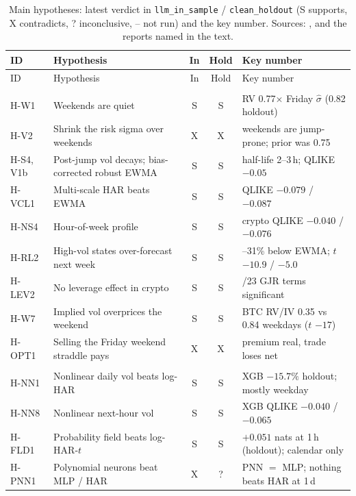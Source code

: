 \documentclass[10pt,a4paper]{article}
\newcommand{\seg}[1]{\texttt{#1}}
\begin{document}
{\small
\begin{longtable}{@{}>{\raggedright\arraybackslash}p{1.55cm}>{\raggedright\arraybackslash}p{6.1cm}cc>{\raggedright\arraybackslash}p{5.3cm}@{}}
\caption{Main hypotheses: latest verdict in \seg{llm\_in\_sample} / \seg{clean\_holdout} (S supports, X contradicts, ? inconclusive, -- not run) and the key number. Sources: \protect{}, \protect{} and the reports named in the text.}\label{tab:results}\\
\toprule
ID & Hypothesis & In & Hold & Key number \\
\midrule
\endfirsthead
\toprule
ID & Hypothesis & In & Hold & Key number \\
\midrule
\endhead
\multicolumn{5}{@{}l}{\emph{Volatility and calendar}}\\
H-W1 & Weekends are quiet & S & S & RV 0.77$\times$ Friday $\hat\sigma$ (0.82 holdout) \\
H-V2 & Shrink the risk sigma over weekends & X & X & weekends are jump-prone; prior was 0.75 \\
H-S4, V1b & Post-jump vol decays; bias-corrected robust EWMA & S & S & half-life 2--3\,h; QLIKE $-0.05$ \\
H-VCL1 & Multi-scale HAR beats EWMA & S & S & QLIKE $-0.079$ / $-0.087$ \\
H-NS4 & Hour-of-week profile & S & S & crypto QLIKE $-0.040$ / $-0.076$ \\
H-RL2 & High-vol states over-forecast next week & S & S & 13--31\% below EWMA; $t$ $-10.9$ / $-5.0$ \\
H-LEV2 & No leverage effect in crypto & S & S & 0/23 GJR terms significant \\
H-W7 & Implied vol overprices the weekend & S & S & BTC RV/IV 0.35 vs 0.84 weekdays ($t$ $-17$) \\
H-OPT1 & Selling the Friday weekend straddle pays & X & X & premium real, trade loses net \\
\multicolumn{5}{@{}l}{\emph{ML and probabilistic models}}\\
H-NN1 & Nonlinear daily vol beats log-HAR & S & S & XGB $-15.7\%$ holdout; mostly weekday \\
H-NN8 & Nonlinear next-hour vol & S & S & XGB QLIKE $-0.040$ / $-0.065$ \\
H-FLD1 & Probability field beats log-HAR-$t$ & S & S & $+0.051$ nats at 1\,h (holdout); calendar only \\
H-PNN1 & Polynomial neurons beat MLP / HAR & X & ? & PNN $=$ MLP; nothing beats HAR at 1\,d \\

\end{longtable}}
\end{document}
